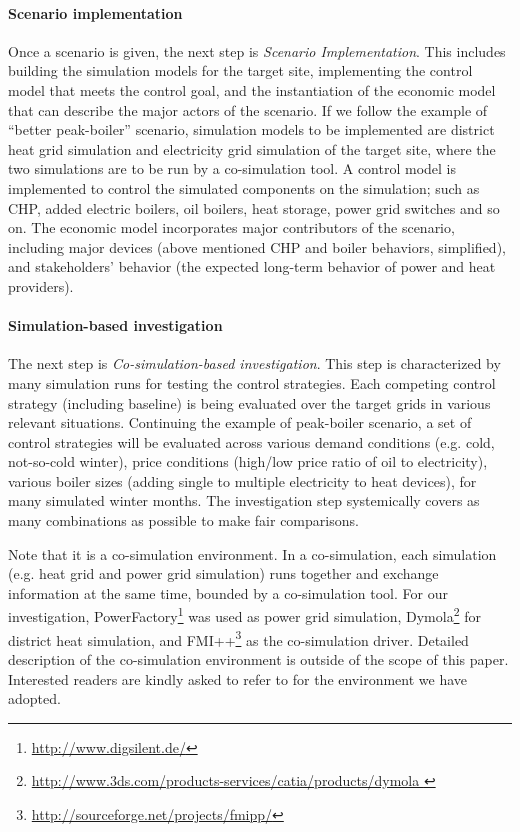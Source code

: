 \documentclass[review]{elsarticle}
\begin{document}
\paragraph{Scenario implementation} 
Once a scenario is given, the next step is {\em Scenario
  Implementation}. This includes building the simulation models 
for the target site, implementing the control model that meets the
control goal, and the instantiation of the economic model that can
describe the major actors of the scenario. 
If we follow the example of  ``better peak-boiler'' scenario,
simulation models to be implemented are district heat grid simulation
and electricity grid simulation of the target site, where the two
simulations are to be run by a co-simulation tool. A control model is
implemented to control the simulated components on the simulation;
such as CHP, added electric boilers, oil boilers, heat storage, power
grid switches and so on. The economic model incorporates major
contributors of the scenario, including major devices (above mentioned
CHP and boiler behaviors, simplified), and stakeholders' behavior (the
expected long-term behavior of power and heat providers). 

\paragraph{Simulation-based investigation} 
The next step is {\em Co-simulation-based investigation}. 
This step is characterized by many simulation runs for testing the
control strategies. 
Each competing control strategy (including baseline) is being
evaluated over the target grids in various relevant situations. 
Continuing the example of peak-boiler scenario, a set
of control strategies will be evaluated across various demand
conditions (e.g. cold, not-so-cold winter), price conditions (high/low
price ratio of oil to electricity), various boiler sizes (adding
single to multiple electricity to heat devices), for many simulated
winter months. The investigation step systemically covers as many 
combinations as possible to make fair comparisons.   

Note that it is a co-simulation environment. In a co-simulation, each
simulation (e.g. heat grid and power grid simulation) runs together
and exchange information at the same time, bounded by a co-simulation
tool. 
For our investigation,
PowerFactory\footnote{\url{http://www.digsilent.de/}} was used as
power grid simulation, Dymola\footnote{\url{http://www.3ds.com/products-services/catia/products/dymola
 }} for district heat simulation, and  FMI++\footnote{\url{http://sourceforge.net/projects/fmipp/}} as the 
co-simulation driver.  
Detailed description of the co-simulation environment is outside of
the scope of this paper. Interested readers are kindly asked to refer
to \cite{Widl_2015} for the environment we have adopted. 
\end{document}
